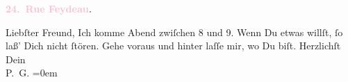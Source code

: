            \pstart
           \begin{otherlanguage}{french}\textcolor{gray}{\textbf{\textbf{\textcolor{pink}{24. Rue Feydeau}{}\ledrightnote{\textcolor{pink}{rue Feydeau}}.}}}\end{otherlanguage}\pend
           \pstart\center{}Liebſter Freund,\pend\pstart
           Ich komme Abend zwiſchen 8 und 9. Wenn Du
               etwas \label{K_L02812-1v}\label{K_L02812-1h} willſt, ſo laß’ Dich nicht
               ſtören.\pend
           \pstart
           Gehe voraus und hinter laſſe mir, wo Du biſt.\pend
           \pstart
           Herzlichſt {\\[\baselineskip]}Dein {\\[\baselineskip]}\spacefill\mbox{P. G.}\pend
           \leftskip=0em{}\endnumbering{}\begin{anhang}\end{anhang}
      